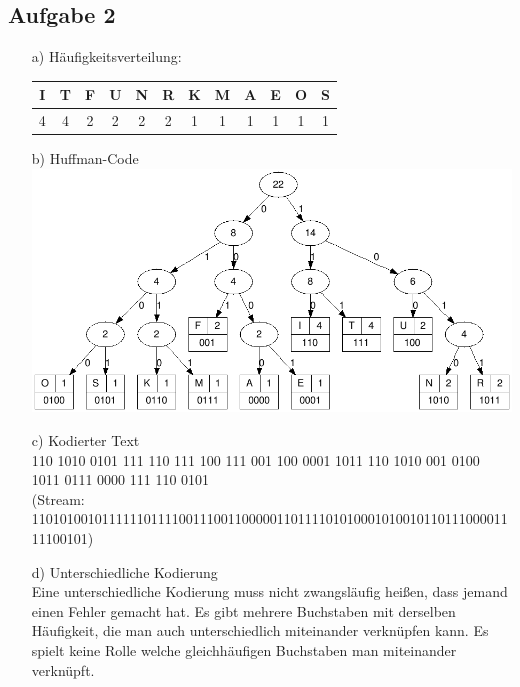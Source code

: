 \documentclass{scrartcl}
\begin{document}
	\subsection*{Aufgabe 2}
	\begin{itemize}
		\item[a)] Häufigkeitsverteilung:
		 \begin{table}[h]
			\begin{tabular}{c|c|c|c|c|c|c|c|c|c|c|c}

				I & T & F & U & N & R & K & M & A & E & O & S \\ \hline
				4 & 4 & 2 & 2 & 2 & 2 & 1 & 1 & 1 & 1 & 1 & 1 \\
			\end{tabular}
		\end{table}

	 	\newpage
	 	\item[b)] Huffman-Code\\ \includegraphics[width=13cm]{tree.png}

	 	\item[c)] Kodierter Text \\
	 	110 1010 0101 111 110 111 100 111 001 100 0001 1011 110 1010 001 0100 1011 0111 0000 111 110 0101 \\
    (Stream: 1101010010111111011110011100110000011011110101000101001011011100001111100101) \\
	 	\item[d)] Unterschiedliche Kodierung\\
	 	Eine unterschiedliche Kodierung muss nicht zwangsläufig heißen, dass jemand einen Fehler gemacht hat.
    Es gibt mehrere Buchstaben mit derselben Häufigkeit, die man auch unterschiedlich miteinander verknüpfen kann.
    Es spielt keine Rolle welche gleichhäufigen Buchstaben man miteinander verknüpft.
	\end{itemize}
\end{document}
